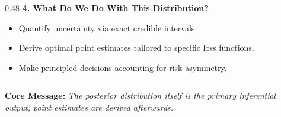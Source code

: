 \documentclass[aspectratio=169,10pt]{beamer}
\begin{document}
\begin{frame}[c]
\begin{columns}[t,onlytextwidth]
\begin{column}{0.48\textwidth}
      {\small \textbf{\color{accentgreen} 4. What Do We Do With This Distribution?}}\\[0.04cm]
      {\scriptsize
      \begin{itemize}
        \setlength{\itemsep}{0.04cm}
        \item Quantify uncertainty via exact credible intervals.
        \item Derive optimal point estimates tailored to specific loss functions.
        \item Make principled decisions accounting for risk asymmetry.
      \end{itemize}}
    \end{column}
  \end{columns}
  
  \vspace{0.25cm}
  \begin{center}
    \setlength{\fboxrule}{1pt}
  \end{center}
  
  \vspace{0.12cm}
  \begin{center}
    {\footnotesize \textbf{\color{headernavy} Core Message: } \textit{The posterior distribution itself is the primary inferential output; point estimates are derived afterwards.}}
  \end{center}
\end{frame}
\end{document}
